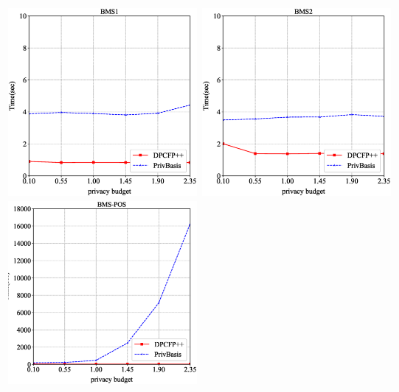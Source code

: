 \documentclass[conference]{IEEEtran}
\begin{document}
\begin{figure}[htbp]
    \centering
    \begin{minipage}[t]{0.3\textwidth}
    \centering
    \includegraphics[width=5cm]{Runtime_BMS1.eps}
    \end{minipage}
    \hfill
    \begin{minipage}[t]{0.3\textwidth}
    \centering
    \includegraphics[width=5cm]{Runtime_BMS2.eps}
    \end{minipage}
    \hfill
    \begin{minipage}[t]{0.3\textwidth}
    \centering
    \includegraphics[width=5cm]{Runtime_BMS-POS.eps}
    \end{minipage}
    

\end{figure}
\end{document}
